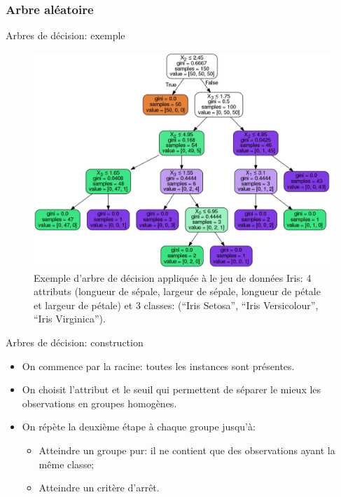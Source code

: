 \documentclass[8pt]{beamer}
\begin{document}
			\subsubsection{Arbre aléatoire}
				\begin{frame}{Arbres de décision: exemple}
					\begin{figure}[H]
						\includegraphics[width=.65\textwidth]{images/samples/example_dt_iris_dataset.png}
						\caption*{Exemple d'arbre de décision appliquée à le jeu de données Iris: 4 attributs (longueur de sépale, largeur de sépale, longueur de pétale et largeur de pétale) et 3 classes: (``Iris Setosa'', ``Iris Versicolour'', ``Iris Virginica'').}
					\end{figure}
				\end{frame}
				\begin{frame}{Arbres de décision: construction}
					\begin{itemize}
						\item<1-> On commence par la racine: toutes les instances sont présentes.
						\item<2-> On choisit l'attribut et le seuil qui permettent de séparer le mieux les observations en groupes homogènes.
						\item<3-> On répète la deuxième étape à chaque groupe jusqu'à:
							\begin{itemize}
								\item<4-> Atteindre un groupe pur: il ne contient que des observations ayant la même classe;
								\item<5-> Atteindre un critère d'arrêt.
							\end{itemize}
					\end{itemize}
				\end{frame}
\end{document}
